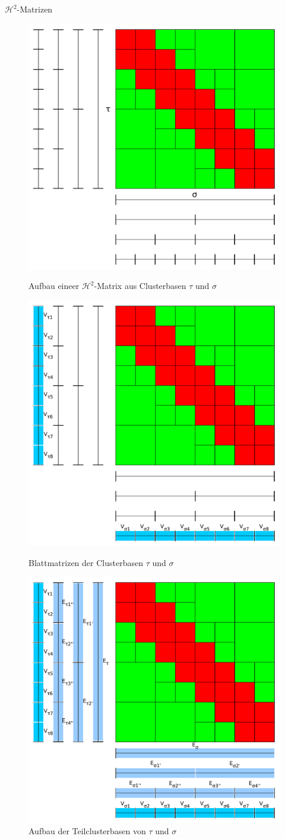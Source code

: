 \documentclass[10pt]{beamer}
\begin{document}
\begin{frame}{\(\mathcal{H}^2\)-Matrizen}
  \begin{figure}
    \begin{overprint}
      \centering\includegraphics[width=.5\linewidth]{figures/fg-h2-matrix.pdf}\caption{Aufbau eineer \(\mathcal{H}^2\)-Matrix aus Clusterbasen \(\tau\) und \(\sigma\)}
      \centering\includegraphics[width=.5\linewidth]{figures/fg-h2-leaf-matrices.pdf}\caption{Blattmatrizen der Clusterbasen \(\tau\) und \(\sigma\)}
      \centering\includegraphics[width=.5\linewidth]{figures/fg-h2-transfer-matrices.pdf}\caption{Aufbau der Teilclusterbasen von \(\tau\) und \(\sigma\)}

\end{overprint}
\end{figure}
\end{frame}
\end{document}
